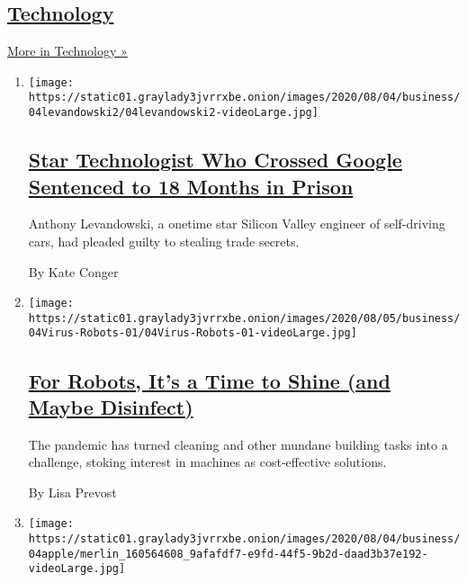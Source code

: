 \hypertarget{technology-1}{%
\subsection{\texorpdfstring{\href{/section/technology}{Technology}}{Technology}}\label{technology-1}}

\href{/section/technology}{More in Technology »}

\begin{enumerate}
\def\labelenumi{\arabic{enumi}.}
\item
  \texttt{[image: https://static01.graylady3jvrrxbe.onion/images/2020/08/04/business/04levandowski2/04levandowski2-videoLarge.jpg]}

  \hypertarget{star-technologist-who-crossed-google-sentenced-to-18-months-in-prison}{%
  \subsection{\texorpdfstring{\href{/2020/08/04/technology/levandowski-google-uber-sentencing-trade-secrets.html}{Star
  Technologist Who Crossed Google Sentenced to 18 Months in
  Prison}}{Star Technologist Who Crossed Google Sentenced to 18 Months in Prison}}\label{star-technologist-who-crossed-google-sentenced-to-18-months-in-prison}}

  Anthony Levandowski, a onetime star Silicon Valley engineer of
  self-driving cars, had pleaded guilty to stealing trade secrets.

  By Kate Conger
\item
  \texttt{[image: https://static01.graylady3jvrrxbe.onion/images/2020/08/05/business/04Virus-Robots-01/04Virus-Robots-01-videoLarge.jpg]}

  \hypertarget{for-robots-its-a-time-to-shine-and-maybe-disinfect}{%
  \subsection{\texorpdfstring{\href{/2020/08/04/business/robot-cleaning-coronavirus.html}{For
  Robots, It's a Time to Shine (and Maybe
  Disinfect)}}{For Robots, It's a Time to Shine (and Maybe Disinfect)}}\label{for-robots-its-a-time-to-shine-and-maybe-disinfect}}

  The pandemic has turned cleaning and other mundane building tasks into
  a challenge, stoking interest in machines as cost-effective solutions.

  By Lisa Prevost
\item
  \texttt{[image: https://static01.graylady3jvrrxbe.onion/images/2020/08/04/business/04apple/merlin\_160564608\_9afafdf7-e9fd-44f5-9b2d-daad3b37e192-videoLarge.jpg]}


\end{enumerate}
